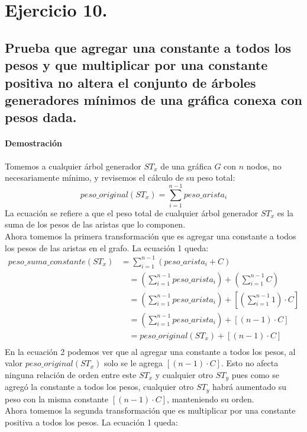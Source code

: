 \documentclass[12pt]{article}
\begin{document}
\section{Ejercicio 10.}
\subsection{Prueba que agregar una constante a todos los pesos y que multiplicar por una constante positiva no altera el conjunto de árboles generadores mínimos de una gráfica conexa con pesos dada.}
\paragraph{Demostración} Tomemos a cualquier árbol generador $ST_x$ de una gráfica $G$ con $n$ nodos, no necesariamente mínimo, y revisemos el cálculo de su peso total:
\begin{equation}
peso\_original(ST_x) = \sum_{i=1}^{n - 1} peso\_arista_i 
\end{equation}
La ecuación se refiere a que el peso total de cualquier árbol generador $ST_x$  es la suma de los pesos de las aristas que lo componen.\\
Ahora tomemos la primera transformación que es agregar una constante a todos los pesos de las aristas en el grafo. La ecuación 1 queda:
\begin{equation}
\begin{split}
peso\_suma\_constante(ST_x) & = \sum_{i=1}^{n - 1} (peso\_arista_i + C ) \\
&\quad = (\sum_{i=1}^{n - 1} peso\_arista_i) + (\sum_{i=1}^{n - 1} C) \\  
&\quad = (\sum_{i=1}^{n - 1} peso\_arista_i) + [(\sum_{i=1}^{n - 1}1) \cdot C] \\  
&\quad = (\sum_{i=1}^{n - 1} peso\_arista_i) + [(n-1) \cdot C] \\  
&\quad = peso\_original(ST_x)+ [(n-1) \cdot C] \\  
\end{split}
\end{equation}
En la ecuación 2 podemos ver que al agregar una constante a todos los pesos,  al valor $peso\_original(ST_x)$ solo se le agrega $[(n-1) \cdot C]$. Esto no afecta ninguna relación de orden entre este $ST_x$ y cualquier otro $ST_y$ pues como se agregó la constante a todos los pesos, cualquier otro $ST_y$ habrá aumentado su peso con la misma constante $[(n-1) \cdot C]$, manteniendo su orden.\\
Ahora tomemos la segunda transformación que es multiplicar por una constante positiva a todos los pesos. La ecuación 1 queda:
\end{document}
